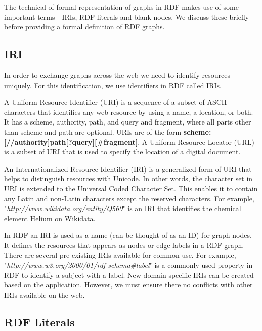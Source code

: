 The technical of formal representation of graphs in RDF makes use of some important terms - IRIs, RDF literals and blank nodes. We discuss these briefly before providing a formal definition of RDF graphs.

\subsection*{IRI}

In order to exchange graphs across the web we need to identify resources uniquely. For this identification, we use identifiers in RDF called IRIs. 

A Uniform Resource Identifier (\acrshort{URI}) is a sequence of a subset of ASCII characters that identifies any web resource by using a name, a location, or both. It has a scheme, authority, path, and query and fragment, where all parts other than scheme and path are optional. URIs are of the form \textbf{scheme:[//authority]path[?query][\#fragment]}. A Uniform Resource Locator (\acrshort{URL}) is a subset of URI that is used to specify the location of a digital document.

An Internationalized Resource Identifier (\acrshort{IRI}) is a generalized form of URI that helps to distinguish resources with Unicode. In other words, the character set in URI is extended to the Universal Coded Character Set. This enables it to contain any Latin and non-Latin characters except the reserved characters. For example, "\textit{http://www.wikidata.org/entity/Q560}" is an IRI that identifies the chemical element Helium on Wikidata. 

In RDF an IRI is used as a name (can be thought of as an ID) for graph nodes. It defines the resources that appears as nodes or edge labels in a RDF graph. There are several pre-existing IRIs available for common use. For example, "\textit{http://www.w3.org/2000/01/rdf-schema\#label}" is a commonly used property in RDF to identify a subject with a label. New domain specific IRIs can be created based on the application. However, we must ensure there no conflicts with other IRIs available on the web.

\subsection*{RDF Literals}
\label{subsec:rdf-literals}

